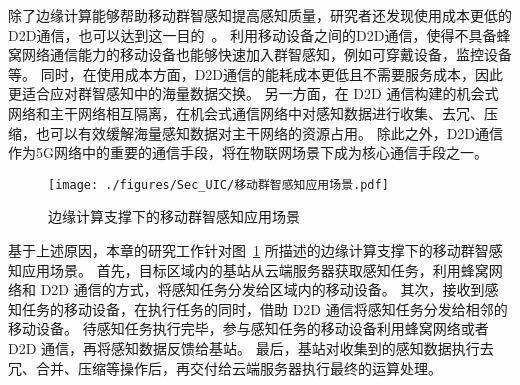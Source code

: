 除了边缘计算能够帮助移动群智感知提高感知质量，研究者还发现使用成本更低的D2D通信，也可以达到这一目的~\cite{DBLP:journals/puc/WangLL17}。
利用移动设备之间的D2D通信，使得不具备蜂窝网络通信能力的移动设备也能够快速加入群智感知，例如可穿戴设备，监控设备等。
同时，在使用成本方面，D2D通信的能耗成本更低且不需要服务成本，因此更适合应对群智感知中的海量数据交换。
另一方面，在 D2D 通信构建的机会式网络和主干网络相互隔离，在机会式通信网络中对感知数据进行收集、去冗、压缩，也可以有效缓解海量感知数据对主干网络的资源占用。
除此之外，D2D通信作为5G网络中的重要的通信手段，将在物联网场景下成为核心通信手段之一。


\begin{figure}[!b]
  \centering
  \vspace{-1em}
  \texttt{[image: ./figures/Sec\_UIC/移动群智感知应用场景.pdf]}
  \vspace{-0.5em}
  \caption{边缘计算支撑下的移动群智感知应用场景}
  \vspace{-1em}
  \label{Figure_UIC_MCS}
\end{figure}

基于上述原因，本章的研究工作针对图~\ref{Figure_UIC_MCS} 所描述的边缘计算支撑下的移动群智感知应用场景。
首先，目标区域内的基站从云端服务器获取感知任务，利用蜂窝网络和 D2D 通信的方式，将感知任务分发给区域内的移动设备。
其次，接收到感知任务的移动设备，在执行任务的同时，借助 D2D 通信将感知任务分发给相邻的移动设备。
待感知任务执行完毕，参与感知任务的移动设备利用蜂窝网络或者 D2D 通信，再将感知数据反馈给基站。
最后，基站对收集到的感知数据执行去冗、合并、压缩等操作后，再交付给云端服务器执行最终的运算处理。


